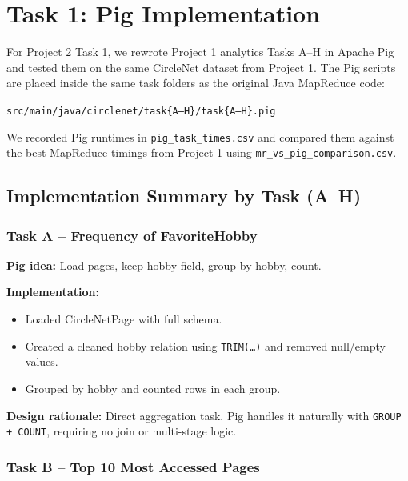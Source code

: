 \documentclass[11pt]{article}
\begin{document}
\section{Task 1: Pig Implementation}

For Project 2 Task 1, we rewrote Project 1 analytics Tasks A--H in Apache Pig and tested them on the same CircleNet dataset from Project 1. The Pig scripts are placed inside the same task folders as the original Java MapReduce code:

\begin{center}\small
\texttt{src/main/java/circlenet/task\{A--H\}/task\{A--H\}.pig}
\end{center}

We recorded Pig runtimes in \texttt{pig\_task\_times.csv} and compared them against the best MapReduce timings from Project 1 using \texttt{mr\_vs\_pig\_comparison.csv}.

\subsection{Implementation Summary by Task (A--H)}

\subsubsection*{Task A -- Frequency of FavoriteHobby}

\textbf{Pig idea:} Load pages, keep hobby field, group by hobby, count.

\textbf{Implementation:}
\begin{itemize}[noitemsep,topsep=2pt]
  \item Loaded CircleNetPage with full schema.
  \item Created a cleaned hobby relation using \texttt{TRIM(\ldots)} and removed null/empty values.
  \item Grouped by hobby and counted rows in each group.
\end{itemize}

\textbf{Design rationale:} Direct aggregation task. Pig handles it naturally with \texttt{GROUP + COUNT}, requiring no join or multi-stage logic.

\subsubsection*{Task B -- Top 10 Most Accessed Pages}
\end{document}
